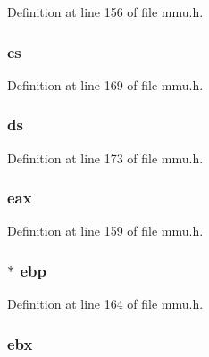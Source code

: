 Definition at line 156 of file mmu.\-h.

\hypertarget{structtaskstate_a2c1a506f83f7be334e4128748f4a2eaa}{
\subsubsection[{cs}]{ cs}}\label{structtaskstate_a2c1a506f83f7be334e4128748f4a2eaa}


Definition at line 169 of file mmu.\-h.

\hypertarget{structtaskstate_a0d354e57548a3fa1b2f8ab075a9bcb7e}{
\subsubsection[{ds}]{ ds}}\label{structtaskstate_a0d354e57548a3fa1b2f8ab075a9bcb7e}


Definition at line 173 of file mmu.\-h.

\hypertarget{structtaskstate_a6f7100b52071edc47e593b1c6a9453cb}{
\subsubsection[{eax}]{ eax}}\label{structtaskstate_a6f7100b52071edc47e593b1c6a9453cb}


Definition at line 159 of file mmu.\-h.

\hypertarget{structtaskstate_a5f72bae04632ef90f7c23e2ea4702c43}{
\subsubsection[{ebp}]{$\ast$ ebp}}\label{structtaskstate_a5f72bae04632ef90f7c23e2ea4702c43}


Definition at line 164 of file mmu.\-h.

\hypertarget{structtaskstate_a685d686dce7abed5d536f3304c4692b9}{
\subsubsection[{ebx}]{ ebx}}\label{structtaskstate_a685d686dce7abed5d536f3304c4692b9}


